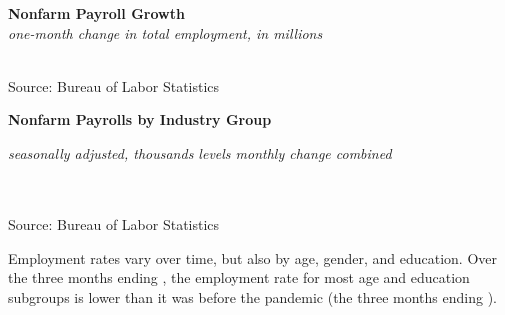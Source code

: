 \documentclass{report}
\newcommand{\tbllink}[1]{\href{https://raw.githubusercontent.com/bdecon/US-chartbook/master/chartbook/data/#1}{\faTable}}
\newcommand{\ctsbar}[5]{
		\addplot[ybar stacked, bar width=#5, draw opacity=0, fill=#1] 
			table [x=#2, y=#3, col sep=comma]{#4};}
\newcommand{\dateaxisticks}{
		date coordinates in=x, axis line style={draw=none},
		xmax={2022-01-30},
		max space between ticks=40,	    
		xtick={{1990-01-01}, {1992-01-01}, {1994-01-01}, 
			{1996-01-01}, {1998-01-01}, {2000-01-01}, 
			{2002-01-01}, {2004-01-01}, {2006-01-01},
			{2008-01-01}, {2010-01-01}, {2012-01-01}, {2014-01-01},
		    {2016-01-01}, {2018-01-01}, {2020-01-01}, {2022-01-01}},
		minor xtick={{1989-01-01}, {1991-01-01}, {1993-01-01},
			{1995-01-01}, {1997-01-01}, {1999-01-01}, 
			{2001-01-01}, {2003-01-01}, {2005-01-01}, {2007-01-01},
		    {2009-01-01}, {2011-01-01}, {2013-01-01}, {2015-01-01},
		    {2017-01-01}, {2019-01-01}, {2021-01-01}},
		enlarge y limits={0.06}, enlarge x limits={0.01},
		}
\newcommand{\bbar}[2]{extra #1 ticks = {{#2}}, extra #1 tick labels = ,
		extra #1 tick style = {grid=major, grid style={thick, black!25}},}
\newcommand{\rbar}{
		\fill[color=black!10] (axis cs:{2020-02-01},\pgfkeysvalueof{/pgfplots/ymin}) rectangle 
			(axis cs:{2020-05-01}, \pgfkeysvalueof{/pgfplots/ymax});}
\begin{document}
{\begin{minipage}{0.28\textwidth}

\end{minipage} \hspace{6mm}
\begin{minipage}{0.43\textwidth}
\normalsize \textbf{Nonfarm Payroll Growth}\\
\footnotesize{\textit{one-month change in total employment, in millions}}\\
\hspace*{-3mm} \\
\footnotesize{Source: Bureau of Labor Statistics} \hfill \tbllink{nfp.csv}
\end{minipage}
\vspace{3mm}

\normalsize \textbf{Nonfarm Payrolls by Industry Group}\\
\footnotesize{\textit{seasonally adjusted, thousands \hspace{9mm}levels \hspace{17mm} monthly change \hspace{29mm} combined}\\
\vspace{-5mm}

\hspace*{-3mm} \noindent {} \setlength{\tabcolsep}{3.1pt} \color{black!90}
		{\renewcommand{\arraystretch}{1.55}
		 \begin{tabular}{p{38mm} R{12mm} R{12mm} | R{9.5mm} R{9.5mm} R{9.5mm} 
		   R{10mm} | R{11mm} R{11mm}}
			  \hline
		\end{tabular}
		}	\\
		
\vspace{-2mm}
\footnotesize{Source: Bureau of Labor Statistics} \hspace{9.7cm} \tbllink{ces_data.csv}

\newpage
\begin{minipage}{0.76\textwidth} 
\small Employment rates vary over time, but also by age, gender, and education. Over the three months ending \unskip, the employment rate for most age and education subgroups is lower than it was before the pandemic (the three months ending \unskip).
\vspace{2mm}


\end{minipage}}}
\end{document}
